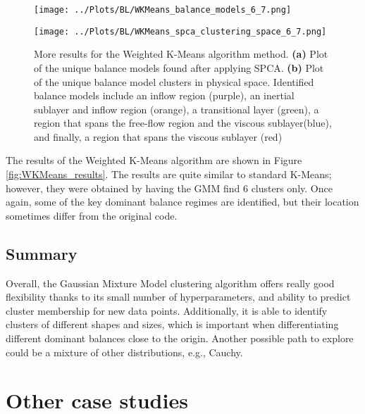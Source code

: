 \documentclass[12pt]{report} %
\begin{document}
\begin{figure}[htbp]
  \centering
  \begin{minipage}[b]{0.6\textwidth}
      \centering
      \texttt{[image: ../Plots/BL/WKMeans\_balance\_models\_6\_7.png]}
      \subcaption{}
  \end{minipage}

  \begin{minipage}[b]{0.8\textwidth}
      \centering
      \texttt{[image: ../Plots/BL/WKMeans\_spca\_clustering\_space\_6\_7.png]}
      \subcaption{}
  \end{minipage}

  \caption{More results for the Weighted K-Means algorithm method. \textbf{(a)} Plot of the unique balance models found after applying SPCA. \textbf{(b)} Plot of the unique balance model clusters in physical space. Identified balance models include an inflow region (purple), an inertial sublayer and inflow region (orange), a transitional layer (green), a region that spans the free-flow region and the viscous sublayer(blue), and finally, a region that spans the viscous sublayer (red)}
  \label{fig:WKMeans_results_2}
\end{figure}

The results of the Weighted K-Means algorithm are shown in Figure \ref{fig:WKMeans_results}. The results are quite similar to standard K-Means; however, they were obtained by having the GMM find 6 clusters only. Once again, some of the key dominant balance regimes are identified, but their location sometimes differ from the original code.

\subsection{Summary}

Overall, the Gaussian Mixture Model clustering algorithm offers really good flexibility thanks to its small number of hyperparameters, and ability to predict cluster membership for new data points. Additionally, it is able to identify clusters of different shapes and sizes, which is important when differentiating different dominant balances close to the origin. Another possible path to explore could be a mixture of other distributions, e.g., Cauchy.

\newpage

\section{Other case studies}
\end{document}
